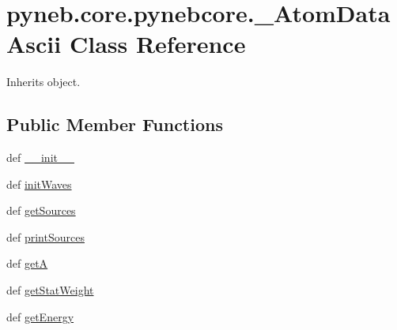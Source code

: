 \hypertarget{classpyneb_1_1core_1_1pynebcore_1_1___atom_data_ascii}{\section{pyneb.\-core.\-pynebcore.\-\_\-\-Atom\-Data\-Ascii Class Reference}
\label{classpyneb_1_1core_1_1pynebcore_1_1___atom_data_ascii}
}


Inherits object.

\subsection*{Public Member Functions}
\begin{DoxyCompactItemize}
\item 
def \hyperlink{classpyneb_1_1core_1_1pynebcore_1_1___atom_data_ascii_a18839ec771a0105ab111f8c6411c70e1}{\-\_\-\-\_\-init\-\_\-\-\_\-}
\item 
def \hyperlink{classpyneb_1_1core_1_1pynebcore_1_1___atom_data_ascii_a11e49056b635286cb2a72631dd7e29b5}{init\-Waves}
\item 
def \hyperlink{classpyneb_1_1core_1_1pynebcore_1_1___atom_data_ascii_a86085b5ba21ae2ce44663130af2bbf01}{get\-Sources}
\item 
def \hyperlink{classpyneb_1_1core_1_1pynebcore_1_1___atom_data_ascii_a7b84583619c025fcd90d2d00308be250}{print\-Sources}
\item 
def \hyperlink{classpyneb_1_1core_1_1pynebcore_1_1___atom_data_ascii_a858e1ecef317c56f7f9e771ed0b5aca9}{get\-A}
\item 
def \hyperlink{classpyneb_1_1core_1_1pynebcore_1_1___atom_data_ascii_a0b913fd7ff9b235a699c735b33c96e85}{get\-Stat\-Weight}
\item 
def \hyperlink{classpyneb_1_1core_1_1pynebcore_1_1___atom_data_ascii_af747dc13a858a4eacc6107aedad89bd0}{get\-Energy}
\end{DoxyCompactItemize}
